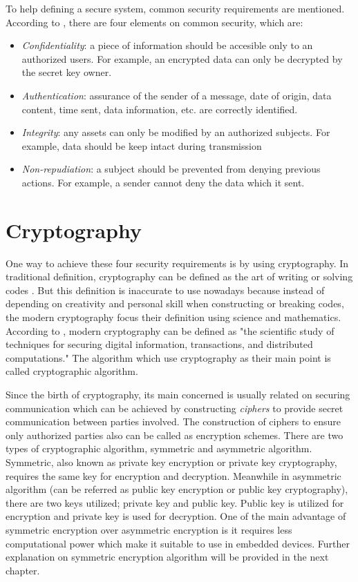To help defining a secure system, common security requirements are mentioned.
According to \cite{cryptography_decrypted}, there are four elements on common security, which are:
\begin{itemize}
  \item \textit{Confidentiality}: a piece of information should be accesible only to an authorized users. For example, an encrypted data can only be decrypted by the secret key owner.
  \item \textit{Authentication}: assurance of the sender of a message, date of origin, data content, time sent, data information, etc. are correctly identified.
  \item \textit{Integrity}: any assets can only be modified by an authorized subjects. For example, data should be keep intact during transmission
  \item \textit{Non-repudiation}: a subject should be prevented from denying previous actions. For example, a sender cannot deny the data which it sent.
\end{itemize}

\section{Cryptography}
One way to achieve these four security requirements is by using cryptography. In traditional definition, cryptography can be defined as the art of writing or solving codes \cite{Oxford_dictionary}. But this definition is inaccurate to use nowadays because instead of depending on creativity and personal skill when constructing or breaking codes, the modern cryptography focus their definition using science and mathematics. According to \cite{modern_cryptography}, modern cryptography can be defined as "the scientific study of techniques for securing digital information, transactions, and distributed computations." The algorithm which use cryptography as their main point is called cryptographic algorithm.

Since the birth of cryptography, its main concerned is usually related on securing communication which can be achieved by constructing \textit{ciphers} to provide secret communication between parties involved. The construction of ciphers to ensure only authorized parties also can be called as encryption schemes.
There are two types of cryptographic algorithm, symmetric and asymmetric algorithm. Symmetric, also known as private key encryption or private key cryptography, requires the same key for encryption and decryption. Meanwhile in asymmetric algorithm (can be referred as public key encryption or public key cryptography), there are two keys utilized; private key and public key. Public key is utilized for encryption and private key is used for decryption. One of the main advantage of symmetric encryption over asymmetric encryption is it requires less computational power which make it suitable to use in embedded devices.
Further explanation on symmetric encryption algorithm will be provided in the next chapter.
